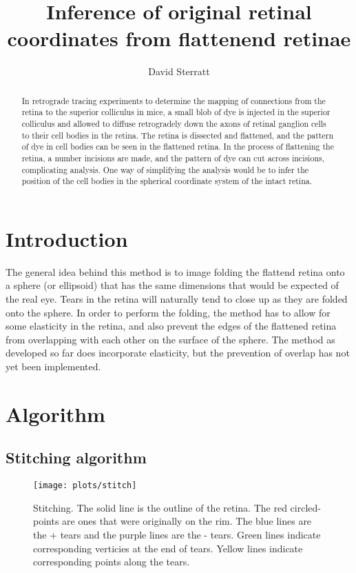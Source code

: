 \documentclass{article}
\title{Inference of original retinal coordinates from  flattenend
  retinae}
\author{David Sterratt}
\begin{document}
\maketitle

\begin{abstract}
  In retrograde tracing experiments to determine the mapping of
  connections from the retina to the superior colliculus in mice, a
  small blob of dye is injected in the superior colliculus and allowed
  to diffuse retrogradely down the axons of retinal ganglion cells to
  their cell bodies in the retina. The retina is dissected and
  flattened, and the pattern of dye in cell bodies can be seen in the
  flattened retina.  In the process of flattening the retina, a number
  incisions are made, and the pattern of dye can cut across incisions,
  complicating analysis.  One way of simplifying the analysis would be
  to infer the position of the cell bodies in the spherical coordinate
  system of the intact retina.  
\end{abstract}

\section{Introduction}
\label{fold-sphere:sec:introduction}

The general idea behind this method is to image folding the flattend
retina onto a sphere (or ellipsoid) that has the same dimensions that
would be expected of the real eye. Tears in the retina will naturally
tend to close up as they are folded onto the sphere.  In order to
perform the folding, the method has to allow for some elasticity in
the retina, and also prevent the edges of the flattened retina from
overlapping with each other on the surface of the sphere. The method
as developed so far does incorporate elasticity, but the prevention of
overlap has not yet been implemented.

\section{Algorithm}
\label{fold-retina:sec:method}

\subsection{Stitching algorithm}
\label{fold-sphere:sec:stitching-algorithm}

\begin{figure}[tp]
  \centering
  \texttt{[image: plots/stitch]}  
  \caption{Stitching. The solid line is the outline of the retina. The
    red circled-points are ones that were originally on the rim. The
    blue lines are the + tears and the purple lines are the - tears.
    Green lines indicate corresponding verticies at the end of tears.
    Yellow lines indicate corresponding points along the tears. }
  \label{fold-sphere:fig:stitch}
\end{figure}
\end{document}
